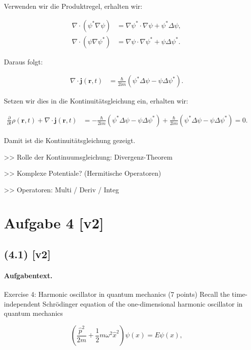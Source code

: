 \documentclass[11pt,a4paper]{article}
\begin{document}
Verwenden wir die Produktregel, erhalten wir:

\begin{align*}
\nabla \cdot (\psi^* \nabla \psi) &= \nabla \psi^* \cdot \nabla \psi + \psi^* \Delta \psi, \\
\nabla \cdot (\psi \nabla \psi^*) &= \nabla \psi \cdot \nabla \psi^* + \psi \Delta \psi^*.
\end{align*}

Daraus folgt:

\begin{align*}
\nabla \cdot \mathbf{j}(\mathbf{r}, t) &= \frac{\hbar}{2 \mathrm{i} m} \left( \psi^* \Delta \psi - \psi \Delta \psi^* \right).
\end{align*}

Setzen wir dies in die Kontinuitätsgleichung ein, erhalten wir:

\begin{align*}
\frac{\partial}{\partial t} \rho(\mathbf{r}, t) + \nabla \cdot \mathbf{j}(\mathbf{r}, t) &= -\frac{\hbar}{2 \mathrm{i} m} \left( \psi^* \Delta \psi - \psi \Delta \psi^* \right) + \frac{\hbar}{2 \mathrm{i} m} \left( \psi^* \Delta \psi - \psi \Delta \psi^* \right) = 0.
\end{align*}

Damit ist die Kontinuitätsgleichung gezeigt.

>> Rolle der Kontinuumsgleichung: Divergenz-Theorem

>> Komplexe Potentiale? (Hermitische Operatoren) 

>> Operatoren: Multi / Deriv / Integ


\section*{Aufgabe 4 [v2]}
\subsection*{(4.1) [v2]}
\paragraph{Aufgabentext.}
Exercise 4: Harmonic oscillator in quantum mechanics (7 points)
Recall the time-independent Schrödinger equation of the one-dimensional harmonic oscillator in quantum mechanics

$$
\left(\frac{\hat{p}^2}{2 m}+\frac{1}{2} m \omega^2 \hat{x}^2\right) \psi(x)=E \psi(x),
$$
\end{document}
